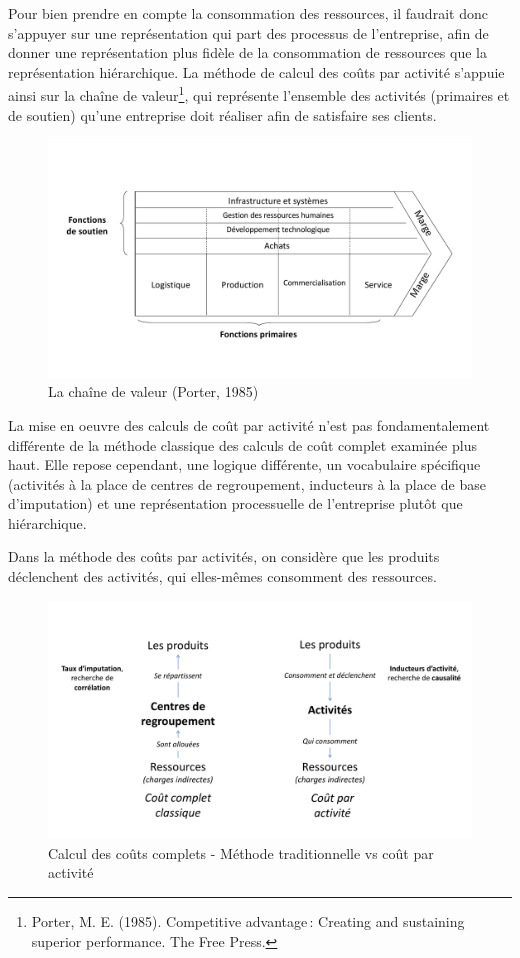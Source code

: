 \documentclass[oneside]{kaobook}
\begin{document}
Pour bien prendre en compte la consommation des ressources, il faudrait donc s'appuyer sur une représentation qui part des processus de l'entreprise, afin de donner une représentation plus fidèle de la consommation de ressources que la représentation hiérarchique. La méthode de calcul des coûts par activité s'appuie ainsi sur la chaîne de valeur\footnote{Porter, M. E. (1985). Competitive advantage : Creating and sustaining superior performance. The Free Press.}, qui représente l'ensemble des activités (primaires et de soutien) qu'une entreprise doit réaliser afin de satisfaire ses clients.

\begin{figure}[H]

\includegraphics{./img/chaine.pdf}
\caption{La chaîne de valeur (Porter, 1985)}
\end{figure}

La mise en oeuvre des calculs de coût par activité n'est pas fondamentalement différente de la méthode classique des calculs de coût complet examinée plus haut. Elle repose cependant, une logique différente, un vocabulaire spécifique (activités à la place de centres de regroupement, inducteurs à la place de base d'imputation) et une représentation processuelle de l’entreprise plutôt que hiérarchique.

Dans la méthode des coûts par activités, on considère que les produits déclenchent des activités, qui elles-mêmes consomment des ressources. 

\begin{figure}[H]

\includegraphics{./img/abc.pdf}
\caption{Calcul des coûts complets - Méthode traditionnelle vs coût par activité}
\end{figure}
\end{document}
